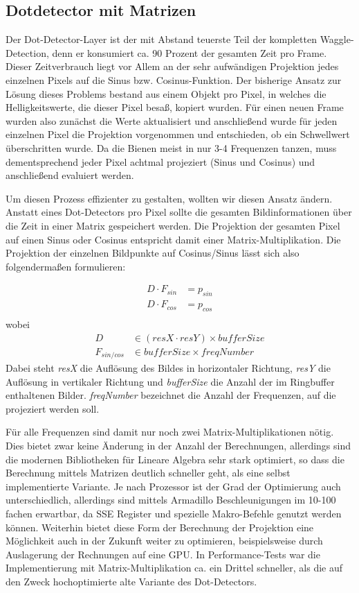 \documentclass[11pt,a4paper]{article}
\begin{document}
\subsection{Dotdetector mit Matrizen}%

Der Dot-Detector-Layer ist der mit Abstand teuerste Teil der kompletten Waggle-Detection, denn er konsumiert ca. 90 Prozent der gesamten Zeit pro Frame.
Dieser Zeitverbrauch liegt vor Allem an der sehr aufwändigen Projektion jedes einzelnen Pixels auf die Sinus bzw. Cosinus-Funktion.
Der bisherige Ansatz zur Lösung dieses Problems bestand aus einem Objekt pro Pixel, in welches die Helligkeitswerte, die dieser Pixel besaß, kopiert wurden.
Für einen neuen Frame wurden also zunächst die Werte aktualisiert und anschließend wurde für jeden einzelnen Pixel die Projektion vorgenommen und entschieden, ob ein Schwellwert überschritten wurde.
Da die Bienen meist in nur 3-4 Frequenzen tanzen, muss dementsprechend jeder Pixel achtmal projeziert (Sinus und Cosinus) und anschließend evaluiert werden.

Um diesen Prozess effizienter zu gestalten, wollten wir diesen Ansatz ändern. Anstatt eines Dot-Detectors pro Pixel sollte die gesamten Bildinformationen über die Zeit in einer Matrix gespeichert werden.
Die Projektion der gesamten Pixel auf einen Sinus oder Cosinus entspricht damit einer Matrix-Multiplikation.
Die Projektion der einzelnen Bildpunkte auf Cosinus/Sinus lässt sich also folgendermaßen formulieren:

\begin{align}
D \cdot F_{sin} &= p_{sin} \\
D \cdot F_{cos} &= p_{cos} \\
\end{align}
wobei
\begin{align*}
D &\in (resX \cdot resY) \times bufferSize \\
F_{sin/cos} &\in bufferSize \times freqNumber
\end{align*}
Dabei steht \textit{resX} die Auflösung des Bildes in horizontaler Richtung, \textit{resY} die Auflösung in vertikaler Richtung und \textit{bufferSize} die Anzahl der im Ringbuffer enthaltenen Bilder. \textit{freqNumber} bezeichnet die Anzahl der Frequenzen, auf die projeziert werden soll.

Für alle Frequenzen sind damit nur noch zwei Matrix-Multiplikationen nötig. Dies bietet zwar keine Änderung in der Anzahl der Berechnungen, allerdings sind die modernen Bibliotheken für Lineare Algebra sehr stark optimiert, so dass die Berechnung mittels Matrizen deutlich schneller geht, als eine selbst implementierte Variante.
Je nach Prozessor ist der Grad der Optimierung auch unterschiedlich, allerdings sind mittels Armadillo Beschleunigungen im 10-100 fachen erwartbar, da SSE Register und spezielle Makro-Befehle genutzt werden können.
Weiterhin bietet diese Form der Berechnung der Projektion eine Möglichkeit auch in der Zukunft weiter zu optimieren, beispielsweise durch Auslagerung der Rechnungen auf eine GPU.
In Performance-Tests war die Implementierung mit Matrix-Multiplikation ca. ein Drittel schneller, als die auf den Zweck hochoptimierte alte Variante des Dot-Detectors.
\end{document}
